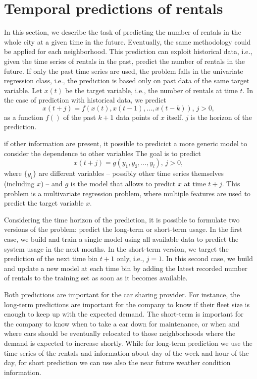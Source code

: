 \section{Temporal predictions of rentals}
\label{sec:8_4_regression}

In this section, we describe the task of predicting the number of rentals in the whole city at a given time in the future. Eventually, the same methodology could be applied for each neighborhood. 
This prediction can exploit historical data, i.e., given the time series of rentals in the past, predict the number of rentals in the future. 
If only the past time series are used, the problem falls in the univariate regression class, i.e., the prediction is based only on past data of the same target variable.
Let $x(t)$ be the target variable, i.e., the number of rentals at time $t$.
In the case of prediction with historical data, we predict 
\[
x(t+j)=f(x(t),x(t-1),\ldots, x(t-k)), \, j>0,
\]
as a function $f()$ of the past $k+1$ data points of $x$ itself. $j$ is the horizon of the prediction.

if other information are present, it possible to predicict a more generic model to consider the dependence to other variables
The goal is to predict
\[
x(t+j)=g(y_1,y_2,\ldots, y_l), \, j>0,
\]
where $\{y_i\}$ are different variables -- possibly other time series themselves (including $x$) -- and $g$ is the model that allows to predict $x$ at time $t+j$.
This problem is a multivariate regression problem, where multiple features are used to predict the target variable $x$.

Considering the time horizon of the prediction, it is possible to formulate two versions of the problem: predict the long-term or short-term usage. In the first case, we build and train a single model using all available data to predict the system usage in the next months.
In the short-term version, we target the prediction of the next time bin $t+1$ only, i.e., $j=1$. In this second case, we build and update a new model at each time bin by adding the latest recorded number of rentals to the training set as soon as it becomes available. 

Both predictions are important for the car sharing provider. For instance, the long-term predictions are important for the company to know if their fleet size is enough to keep up with the expected demand. The short-term is important for the company to know when to take a car down for maintenance, or when and where cars should be eventually relocated to those neighborhoods where the demand is expected to increase shortly. While for long-term prediction we use the time series of the rentals and information about day of the week and hour of the day, for short prediction we can use also the near future weather condition information.  


